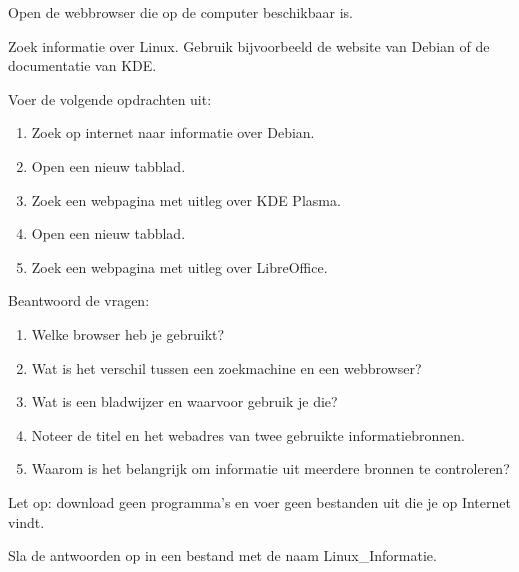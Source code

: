 Open de webbrowser die op de computer beschikbaar is.

Zoek informatie over Linux. Gebruik bijvoorbeeld de website van Debian of de documentatie van KDE.

Voer de volgende opdrachten uit:
\begin{enumerate}
\item Zoek op internet naar informatie over Debian.
\item Open een nieuw tabblad.
\item Zoek een webpagina met uitleg over KDE Plasma.
\item Open een nieuw tabblad.
\item Zoek een webpagina met uitleg over LibreOffice.
\end{enumerate}

Beantwoord de vragen:
\begin{enumerate}
\item Welke browser heb je gebruikt?
\item Wat is het verschil tussen een zoekmachine en een webbrowser?
\item Wat is een bladwijzer en waarvoor gebruik je die?
\item Noteer de titel en het webadres van twee gebruikte informatiebronnen.
\item Waarom is het belangrijk om informatie uit meerdere bronnen te controleren?
\end{enumerate}

Let op: download geen programma's en voer geen bestanden uit die je op Internet vindt.

Sla de antwoorden op in een bestand met de naam {Linux\_Informatie}.


